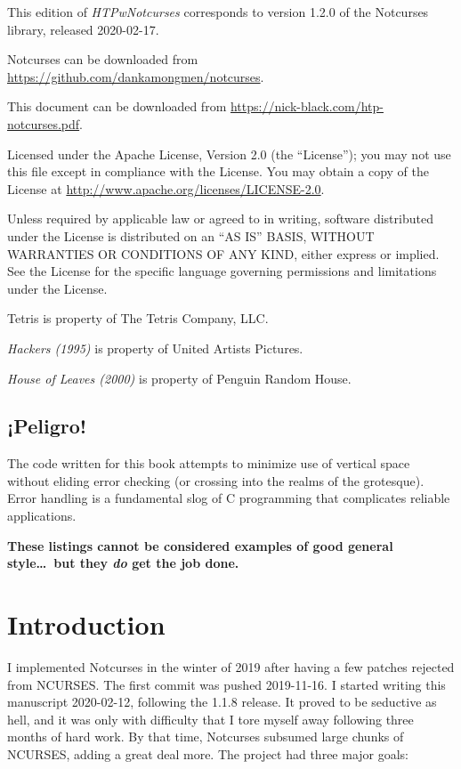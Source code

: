 \documentclass[letterpaper,10pt]{article}
\begin{document}
\small{This edition of \textit{HTPwNotcurses} corresponds to version 1.2.0 of the Notcurses
library, released 2020-02-17.

Notcurses can be downloaded from
\url{https://github.com/dankamongmen/notcurses}.

This document can be downloaded
from \url{https://nick-black.com/htp-notcurses.pdf}.

Licensed under the Apache License, Version 2.0 (the ``License''); you may not use
this file except in compliance with the License. You may obtain a copy of the
License at \url{http://www.apache.org/licenses/LICENSE-2.0}.

Unless required by applicable law or agreed to in writing, software
distributed under the License is distributed on an ``AS IS'' BASIS,
WITHOUT WARRANTIES OR CONDITIONS OF ANY KIND, either express or implied.
See the License for the specific language governing permissions and
limitations under the License.

Tetris is property of The Tetris Company, LLC.

\textit{Hackers (1995)} is property of United Artists Pictures.

\textit{House of Leaves (2000)} is property of Penguin Random House.

\subsection{¡Peligro!}

The code written for this book attempts to minimize use of vertical space
without eliding error checking (or crossing into the realms of the grotesque).
Error handling is a fundamental slog of C programming that
complicates reliable applications.

\textbf{These listings cannot be considered examples of good general style\ldots\ but they \textit{do} get the job done.}

}


\clearpage

\section{Introduction}

I implemented Notcurses in the winter of 2019 after having a few patches
rejected from NCURSES. The first commit was pushed 2019-11-16. I started
writing this manuscript 2020-02-12, following the 1.1.8 release. It proved to
be seductive as hell, and it was only with difficulty that I tore myself away
following three months of hard work. By that time, Notcurses subsumed large
chunks of NCURSES, adding a great deal more. The project had three
major goals:
\end{document}
